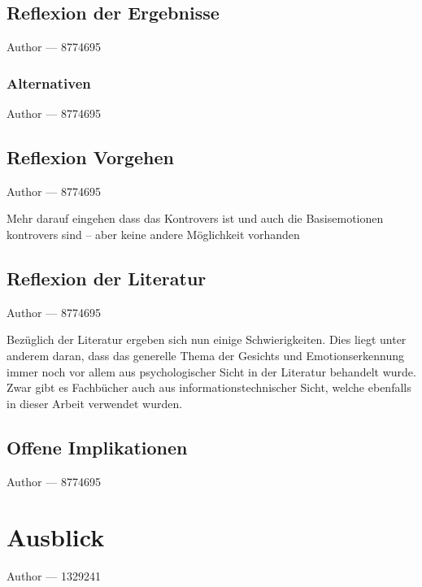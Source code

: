\documentclass[12pt, a4paper]{report}
\makeatletter
\newcommand{\sectionauthor}[1]{%
  {\parindent0pt\vspace*{-5pt}%
  \large{Author --- }
  \linespread{1.1}\large\scshape#1%
  \par\nobreak\vspace*{35pt} }
  \@afterheading%
}
\newcommand{\chapterauthor}[1]{%
  {\parindent0pt\vspace*{-25pt}%
  \large{Author --- }
  \linespread{1.1}\large\scshape#1%
  \par\nobreak\vspace*{35pt} }
  \@afterheading%
}
\makeatother
\begin{document}
\section{Reflexion der Ergebnisse}
\sectionauthor{8774695}

\subsection{Alternativen}
\sectionauthor{8774695}

\section{Reflexion Vorgehen}
\sectionauthor{8774695}
Mehr darauf eingehen dass das Kontrovers ist und auch die Basisemotionen kontrovers sind --  aber keine andere Möglichkeit vorhanden 

\section{Reflexion der Literatur}
\sectionauthor{8774695}
Bezüglich der Literatur ergeben sich nun einige Schwierigkeiten. Dies liegt unter anderem daran, dass das generelle Thema der Gesichts und Emotionserkennung immer noch vor allem aus
psychologischer Sicht in der Literatur behandelt wurde. Zwar gibt es Fachbücher auch aus informationstechnischer Sicht, welche ebenfalls in dieser Arbeit verwendet wurden.

\section{Offene Implikationen}
\sectionauthor{8774695}

\chapter{Ausblick}
\chapterauthor{1329241}
\end{document}
